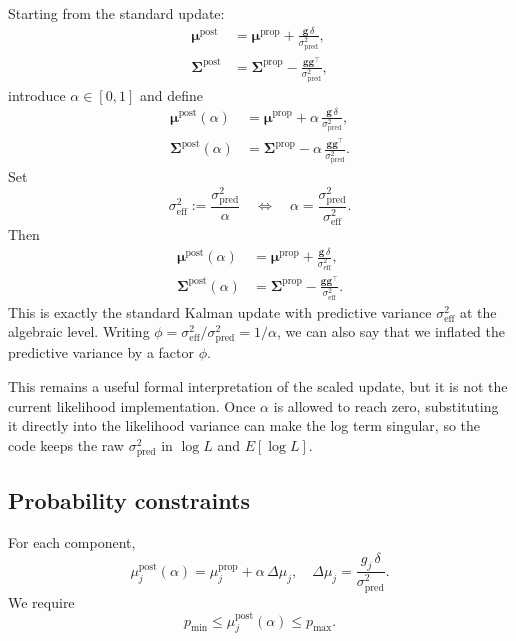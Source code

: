 \documentclass[11pt]{article}
\begin{document}
Starting from the standard update:
\begin{align*}
  \boldsymbol{\mu}^{\text{post}}
  &=
  \boldsymbol{\mu}^{\text{prop}} +
  \frac{\mathbf{g}\,\delta}{\sigma^2_{\text{pred}}},
  \\
  \boldsymbol{\Sigma}^{\text{post}}
  &=
  \boldsymbol{\Sigma}^{\text{prop}} -
  \frac{\mathbf{g}\mathbf{g}^\top}{\sigma^2_{\text{pred}}},
\end{align*}
introduce \(\alpha\in[0,1]\) and define
\begin{align*}
  \boldsymbol{\mu}^{\text{post}}(\alpha)
  &=
  \boldsymbol{\mu}^{\text{prop}} +
  \alpha\,\frac{\mathbf{g}\,\delta}{\sigma^2_{\text{pred}}},
  \\
  \boldsymbol{\Sigma}^{\text{post}}(\alpha)
  &=
  \boldsymbol{\Sigma}^{\text{prop}} -
  \alpha\,\frac{\mathbf{g}\mathbf{g}^\top}{\sigma^2_{\text{pred}}}.
\end{align*}
Set
\[
  \sigma^2_{\text{eff}}
  :=
  \frac{\sigma^2_{\text{pred}}}{\alpha}
  \quad\Longleftrightarrow\quad
  \alpha
  =
  \frac{\sigma^2_{\text{pred}}}{\sigma^2_{\text{eff}}}.
\]
Then
\begin{align*}
  \boldsymbol{\mu}^{\text{post}}(\alpha)
  &=
  \boldsymbol{\mu}^{\text{prop}} +
  \frac{\mathbf{g}\,\delta}{\sigma^2_{\text{eff}}},
  \\
  \boldsymbol{\Sigma}^{\text{post}}(\alpha)
  &=
  \boldsymbol{\Sigma}^{\text{prop}} -
  \frac{\mathbf{g}\mathbf{g}^\top}{\sigma^2_{\text{eff}}}.
\end{align*}
This is exactly the standard Kalman update with predictive variance
\(\sigma^2_{\text{eff}}\) at the algebraic level.
Writing \(\phi = \sigma^2_{\text{eff}}/\sigma^2_{\text{pred}} = 1/\alpha\),
we can also say that we inflated the predictive variance by a factor \(\phi\).

This remains a useful formal interpretation of the scaled update, but it is
not the current likelihood implementation. Once \(\alpha\) is allowed to reach
zero, substituting it directly into the likelihood variance can make the log
term singular, so the code keeps the raw \(\sigma^2_{\text{pred}}\) in
\(\log L\) and \(E[\log L]\).

\subsection{Probability constraints}

For each component,
\[
  \mu^{\text{post}}_j(\alpha)
  =
  \mu^{\text{prop}}_j + \alpha\,\Delta\mu_j,\quad
  \Delta\mu_j
  =
  \frac{g_j\,\delta}{\sigma^2_{\text{pred}}}.
\]
We require
\[
  p_{\min}
  \le
  \mu^{\text{post}}_j(\alpha)
  \le
  p_{\max}.
\]
\end{document}
